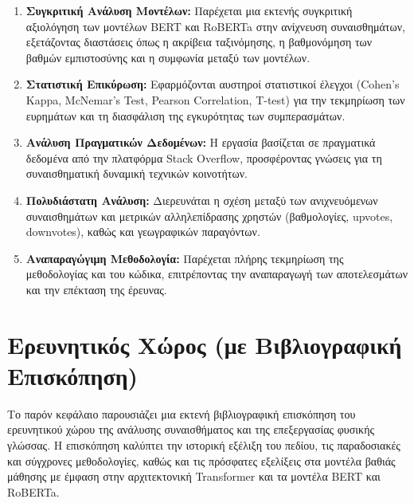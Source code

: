 \documentclass[a4paper,11pt,oneside,openany]{ioniothesis}
\begin{document}
\begin{enumerate}
    \item \textbf{Συγκριτική Ανάλυση Μοντέλων:} Παρέχεται μια εκτενής συγκριτική αξιολόγηση των μοντέλων BERT και RoBERTa στην ανίχνευση συναισθημάτων, εξετάζοντας διαστάσεις όπως η ακρίβεια ταξινόμησης, η βαθμονόμηση των βαθμών εμπιστοσύνης και η συμφωνία μεταξύ των μοντέλων.
    
    \item \textbf{Στατιστική Επικύρωση:} Εφαρμόζονται αυστηροί στατιστικοί έλεγχοι (Cohen's Kappa, McNemar's Test, Pearson Correlation, T-test) για την τεκμηρίωση των ευρημάτων και τη διασφάλιση της εγκυρότητας των συμπερασμάτων.
    
    \item \textbf{Ανάλυση Πραγματικών Δεδομένων:} Η εργασία βασίζεται σε πραγματικά δεδομένα από την πλατφόρμα Stack Overflow, προσφέροντας γνώσεις για τη συναισθηματική δυναμική τεχνικών κοινοτήτων.
    
    \item \textbf{Πολυδιάστατη Ανάλυση:} Διερευνάται η σχέση μεταξύ των ανιχνευόμενων συναισθημάτων και μετρικών αλληλεπίδρασης χρηστών (βαθμολογίες, upvotes, downvotes), καθώς και γεωγραφικών παραγόντων.
    
    \item \textbf{Αναπαραγώγιμη Μεθοδολογία:} Παρέχεται πλήρης τεκμηρίωση της μεθοδολογίας και του κώδικα, επιτρέποντας την αναπαραγωγή των αποτελεσμάτων και την επέκταση της έρευνας.
\end{enumerate}



\section{Ερευνητικός Χώρος (με Βιβλιογραφική Επισκόπηση)}
\label{sec:Ερευνητικός χώρος (με βιβλιογραφική επισκόπηση)}

Το παρόν κεφάλαιο παρουσιάζει μια εκτενή βιβλιογραφική επισκόπηση του ερευνητικού χώρου της ανάλυσης συναισθήματος και της επεξεργασίας φυσικής γλώσσας. Η επισκόπηση καλύπτει την ιστορική εξέλιξη του πεδίου, τις παραδοσιακές και σύγχρονες μεθοδολογίες, καθώς και τις πρόσφατες εξελίξεις στα μοντέλα βαθιάς μάθησης με έμφαση στην αρχιτεκτονική Transformer και τα μοντέλα BERT και RoBERTa.
\end{document}
